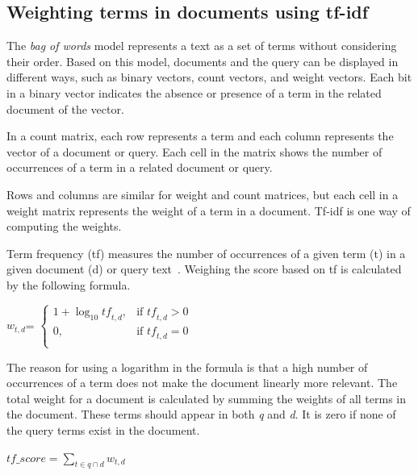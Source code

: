 \documentclass{IOS-Book-Article}
\begin{document}
\subsection{Weighting terms in documents using tf-idf}
\label{sec:tfidf}
The \emph{bag of words} model represents a text as a set of terms without considering their order.
Based on this model, documents and the query can be displayed in different ways, such as binary vectors, count vectors, and weight vectors.
Each bit in a binary vector indicates the absence or presence of a term in the related document of the vector.

In a count matrix, each row represents a term and each column represents the vector of a document or query. Each cell in the matrix shows the number of occurrences of a term in a related document or query. 

Rows and columns are similar for weight and count matrices, but each cell in a weight matrix represents the weight of a term in a document.
Tf-idf is one way of computing the weights.

Term frequency (tf) measures the number of occurrences of a given term (t) in a given document (d) or query text~\citep{SALTON1988}. 
Weighing the score based on tf is calculated by the following formula. 
\begin{center} 
	$w_{t,d}$=
	$\begin{cases}
	1+\log_{10} \mathit{tf}_{t,d}, & \text{if $\mathit{tf}_{t,d}>0$} \\
	0, & \text{if $\mathit{tf}_{t,d}=0$}\\
	\end{cases}$
\end{center}

The reason for using a logarithm in the formula is that a high number of occurrences of a term does not make the document linearly more relevant.
The total weight for a document is calculated by summing the weights of all terms in the document.
These terms should appear in both \textit{q} and \textit{d}.
It is zero if none of the query terms exist in the document.

\begin{center}
	$\mathit{tf\_score}=\sum_{t\in q\cap d} w_{t,d}$
\end{center}
\end{document}
